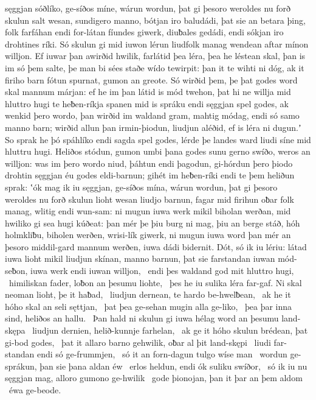 sęggjan sóðlíko, ge-síðos míne,
wárun wordun, þat gi þesoro weroldes nu forð
skulun salt wesan, sundigero manno,
bótjan iro baludádi, þat sie an betara þing,
folk farfáhan endi for-látan fíundes giwerk,
diuƀales gedádi, endi sókjan iro drohtines ríki.
Só skulun gi mid iuwon lérun liudfolk manag
wendean aftar mínon willjon. Ef iuwar þan awirðid hwilik,
farlátid þea léra, þea he léstean skal,
þan is im só þem salte, þe man bi sées staðe
wído tewirpit: þan it te wihti ni dóg,
ak it firiho barn fótun spurnat,
gumon an greote. Só wirðid þem, þe þat godes word skal
mannum márjan: ef he im þan látid is mód twehon,
þat hi ne willja mid hluttro hugi te heƀen-ríkja
spanen mid is spráku endi sęggjan spel godes,
ak wenkid þero wordo, þan wirðid im waldand gram,
mahtig módag, endi só samo manno barn;
wirðid allun þan irmin-þiodun,
liudjun aléðid, ef is léra ni dugun.ʼ
So sprak he þó spáhlíko endi sagda spel godes,
lérde þe landes ward liudi síne
mid hluttru hugi. Heliðos stódun,
gumon umbi þana godes sunu gerno swíðo,
weros an willjon: was im þero wordo niud,
þáhtun endi þagodun, gi-hórdun þero þiodo drohtin
sęggjan éu godes eldi-barnun;
gihét im heƀen-ríki endi te þem heliðun sprak:
ʽók mag ik iu sęggjan, ge-síðos mína,
wárun wordun, þat gi þesoro weroldes nu forð
skulun lioht wesan liudjo barnun,
fagar mid firihun oƀar folk manag,
wlitig endi wun-sam: ni mugun iuwa werk mikil
biholan werðan, mid hwiliko gi sea hugi kúðeat:
þan mér þe þiu burg ni mag, þiu an berge stáð,
hóh holmkliƀu, biholen werðen,
wrisi-lík giwerk, ni mugun iuwa word þan mér
an þesoro middil-gard mannum werðen,
iuwa dádi bidernit. Dót, só ik iu lériu:
látad iuwa lioht mikil liudjun skínan,
manno barnun, þat sie farstandan iuwan mód-seƀon,
iuwa werk endi iuwan willjon, \hld\ endi þes waldand god
mit hluttro hugi, \hld\ himiliskan fader,
loƀon an þesumu liohte, \hld\ þes he iu sulika léra far-gaf.
Ni skal neoman lioht, þe it haƀad, \hld\ liudjun dernean,
te hardo be-hwelƀean, \hld\ ak he it hóho skal
an seli sęttjan, \hld\ þat þea ge-sehan mugin
alla ge-liko, \hld\ þea þar inna sind,
heliðos an hallu. \hld\ Þan hald ni skulun gi iuwa hélag word
an þesumu land-skępa \hld\ liudjun dernien,
helið-kunnje farhelan, \hld\ ak ge it hóho skulun
brédean, þat gi-bod godes, \hld\ þat it allaro barno gehwilik,
oƀar al þit land-skępi \hld\ liudi far-standan
endi só ge-frummjen, \hld\ só it an forn-dagun
tulgo wíse man \hld\ wordun ge-sprákun,
þan sie þana aldan éw \hld\ erlos heldun,
endi ók suliku swíðor, \hld\ só ik iu nu sęggjan mag,
alloro gumono ge-hwilik \hld\ gode þionojan,
þan it þar an þem aldom \hld\ éwa ge-beode.
